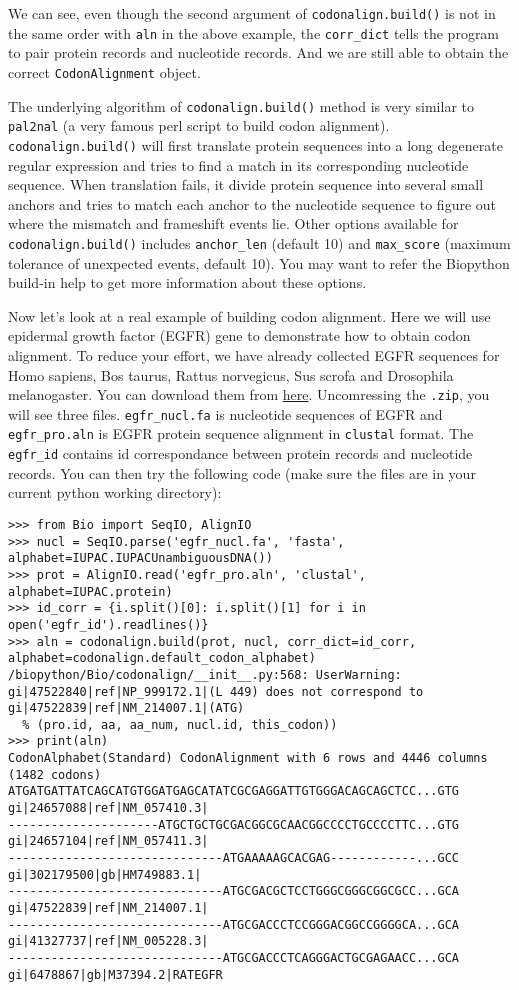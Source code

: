 We can see, even though the second argument of \verb|codonalign.build()|
is not in the same order with \texttt{aln} in the above example, the
\texttt{corr\_dict} tells the program to pair protein records and
nucleotide records. And we are still able to obtain the correct
\verb|CodonAlignment| object.

The underlying algorithm of \verb|codonalign.build()| method is very
similar to \texttt{pal2nal} (a very famous perl script to build codon
alignment). \verb|codonalign.build()| will first translate protein
sequences into a long degenerate regular expression and tries to find a
match in its corresponding nucleotide sequence. When translation fails,
it divide protein sequence into several small anchors and tries to match
each anchor to the nucleotide sequence to figure out where the mismatch
and frameshift events lie. Other options available for
\verb|codonalign.build()| includes \texttt{anchor\_len} (default 10) and
\texttt{max\_score} (maximum tolerance of unexpected events, default
10). You may want to refer the Biopython build-in help to get more
information about these options.

Now let's look at a real example of building codon alignment. Here we
will use epidermal growth factor (EGFR) gene to demonstrate how to
obtain codon alignment. To reduce your effort, we have already collected
EGFR sequences for Homo sapiens, Bos taurus, Rattus norvegicus,
Sus scrofa and Drosophila melanogaster. You can download them from
\href{http://zruanweb.com/egfr.zip}{here}. Uncomressing the
\texttt{.zip}, you will see three files. \texttt{egfr\_nucl.fa} is
nucleotide sequences of EGFR and \texttt{egfr\_pro.aln} is EGFR protein
sequence alignment in \texttt{clustal} format. The \texttt{egfr\_id}
contains id correspondance between protein records and nucleotide
records. You can then try the following code (make sure the files are in
your current python working directory):

\begin{verbatim}
>>> from Bio import SeqIO, AlignIO
>>> nucl = SeqIO.parse('egfr_nucl.fa', 'fasta', alphabet=IUPAC.IUPACUnambiguousDNA())
>>> prot = AlignIO.read('egfr_pro.aln', 'clustal', alphabet=IUPAC.protein)
>>> id_corr = {i.split()[0]: i.split()[1] for i in open('egfr_id').readlines()}
>>> aln = codonalign.build(prot, nucl, corr_dict=id_corr, alphabet=codonalign.default_codon_alphabet)
/biopython/Bio/codonalign/__init__.py:568: UserWarning: gi|47522840|ref|NP_999172.1|(L 449) does not correspond to gi|47522839|ref|NM_214007.1|(ATG)
  % (pro.id, aa, aa_num, nucl.id, this_codon))
>>> print(aln)
CodonAlphabet(Standard) CodonAlignment with 6 rows and 4446 columns (1482 codons)
ATGATGATTATCAGCATGTGGATGAGCATATCGCGAGGATTGTGGGACAGCAGCTCC...GTG gi|24657088|ref|NM_057410.3|
---------------------ATGCTGCTGCGACGGCGCAACGGCCCCTGCCCCTTC...GTG gi|24657104|ref|NM_057411.3|
------------------------------ATGAAAAAGCACGAG------------...GCC gi|302179500|gb|HM749883.1|
------------------------------ATGCGACGCTCCTGGGCGGGCGGCGCC...GCA gi|47522839|ref|NM_214007.1|
------------------------------ATGCGACCCTCCGGGACGGCCGGGGCA...GCA gi|41327737|ref|NM_005228.3|
------------------------------ATGCGACCCTCAGGGACTGCGAGAACC...GCA gi|6478867|gb|M37394.2|RATEGFR
\end{verbatim}

